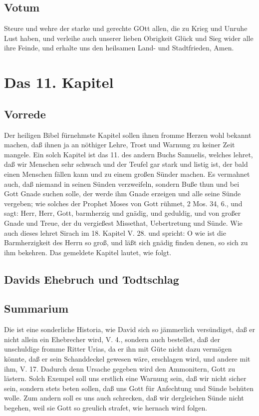 \section{Votum}

Steure und wehre der starke und gerechte GOtt allen, die zu Krieg und Unruhe Lust haben, und verleihe auch unserer lieben Obrigkeit Glück und Sieg wider alle ihre Feinde, und erhalte uns den heilsamen Land- und Stadtfrieden, Amen.

\chapter{Das 11. Kapitel}

\section{Vorrede}

Der heiligen Bibel fürnehmste Kapitel sollen ihnen fromme Herzen wohl bekannt machen, daß ihnen ja an nöthiger Lehre, Trost und Warnung zu keiner Zeit mangele. Ein solch Kapitel ist das 11. des andern Buchs Samuelis, welches lehret, daß wir Menschen sehr schwach und der Teufel gar stark und listig ist, der bald einen Menschen fällen kann und zu einem großen Sünder machen. Es vermahnet auch, daß niemand in seinen Sünden verzweifeln, sondern Buße thun und bei Gott Gnade suchen solle, der werde ihm Gnade erzeigen und alle seine Sünde vergeben; wie solches der Prophet Moses von Gott rühmet, 2 Mos. 34, 6., und sagt: Herr, Herr, Gott, barmherzig und gnädig, und geduldig, und von großer Gnade und Treue, der du vergießest Missethat, Uebertretung und Sünde. Wie auch dieses lehret Sirach im 18. Kapitel V. 28. und spricht: O wie ist die Barmherzigkeit des Herrn so groß, und läßt sich gnädig finden denen, so sich zu ihm bekehren. Das gemeldete Kapitel lautet, wie folgt.

\section{Davids Ehebruch und Todtschlag}

\section{Summarium}

Die ist eine sonderliche Historia, wie David sich so jämmerlich versündiget, daß er nicht allein ein Ehebrecher wird, V. 4., sondern auch bestellet, daß der unschuldige fromme Ritter Urias, da er ihn mit Güte nicht dazu vermögen könnte, daß er sein Schanddeckel gewesen wäre, erschlagen wird, und andere mit ihm, V. 17. Dadurch denn Ursache gegeben wird den Ammonitern, Gott zu lästern. Solch Exempel soll uns erstlich eine Warnung sein, daß wir nicht sicher sein, sondern stets beten sollen, daß uns Gott für Anfechtung und Sünde behüten wolle. Zum andern soll es uns auch schrecken, daß wir dergleichen Sünde nicht begehen, weil sie Gott so greulich strafet, wie hernach wird folgen.

